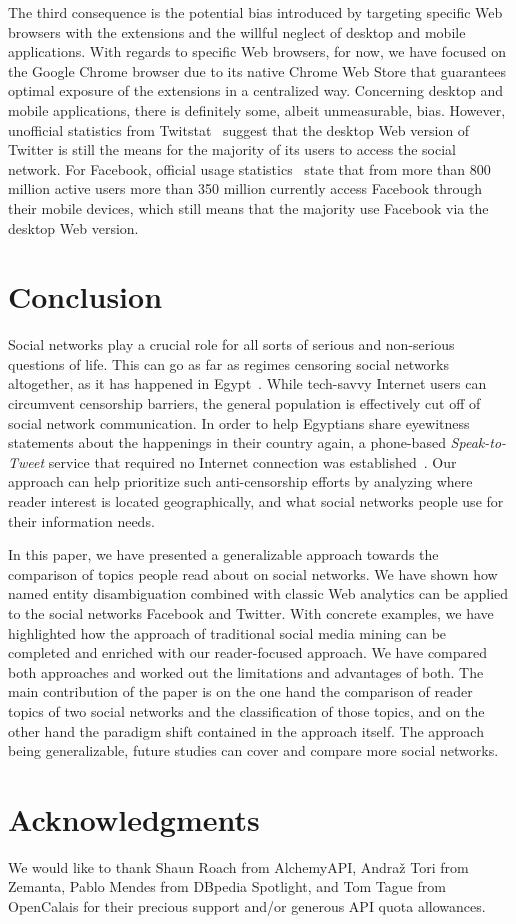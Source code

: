 \documentclass{iosart2c}
\begin{document}
The third consequence is the potential bias introduced by targeting specific Web browsers with the extensions and the willful neglect of desktop and mobile applications. 
With regards to specific Web browsers, for now, we have focused on the Google Chrome browser due to its native Chrome Web Store that guarantees optimal exposure of the extensions in a centralized way.
Concerning desktop and mobile applications, there is definitely some, albeit unmeasurable, bias.
However, unofficial statistics from Twitstat~\cite{twitstat} suggest that the desktop Web version of Twitter is still the means for the majority of its users to access the social network.
For Facebook, official usage statistics~\cite{facebookstats} state that from more than 800 million active users more than 350 million currently access Facebook through their mobile devices, which still means that the majority use Facebook via the desktop Web version.

\section{Conclusion} \label{sec:conclusion}
Social networks play a crucial role for all sorts of serious and non-serious questions of life.
This can go as far as regimes censoring social networks altogether, as it has happened in Egypt~\cite{censor}.
While tech-savvy Internet users can circumvent censorship barriers, the general population is effectively cut off of social network communication.
In order to help Egyptians share eyewitness statements about the happenings in their country again, a phone-based \emph{Speak-to-Tweet} service that required no Internet connection was established~\cite{egypt}.
Our approach can help prioritize such anti-censorship efforts by analyzing where reader interest is located geographically, and what social networks people use for their information needs.

In this paper, we have presented a generalizable approach towards the comparison of topics people read about on social networks.
We have shown how named entity disambiguation combined with classic Web analytics can be applied to the social networks Facebook and Twitter.
With concrete examples, we have highlighted how the approach of traditional social media mining can be completed and enriched with our reader-focused approach.
We have compared both approaches and worked out the limitations and advantages of both.
The main contribution of the paper is on the one hand the comparison of reader topics of two social networks and the classification of those topics, and on the other hand the paradigm shift contained in the approach itself.
The approach being generalizable, future studies can cover and compare more social networks.

\section*{Acknowledgments}
We would like to thank Shaun Roach from AlchemyAPI, Andraž Tori from Zemanta, Pablo Mendes from DBpedia Spotlight, and Tom Tague from OpenCalais for their precious support and/or generous API quota allowances. 



\end{document}
